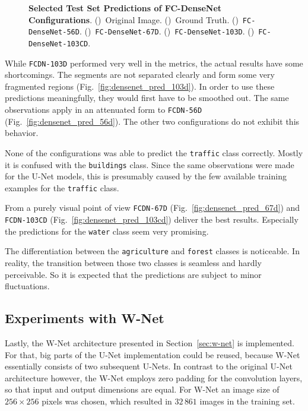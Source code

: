 \begin{figure}[h]
    \caption[Selected Test Set Predictions of FC-DenseNet Configurations]
    {\textbf{Selected Test Set Predictions of FC-DenseNet Configurations}.
    ()~Original Image.
    ()~Ground Truth.
    ()~\texttt{FC-DenseNet-56D}.
    ()~\texttt{FC-DenseNet-67D}.
    ()~\texttt{FC-DenseNet-103D}.
    ()~\texttt{FC-DenseNet-103CD}.}
    \label{fig:densenet_prediction_images}
\end{figure}

While \texttt{FCDN-103D} performed very well in the metrics, the actual results have some shortcomings. The segments are not separated clearly and form some very fragmented regions (Fig.~\ref{fig:densenet_pred_103d}). In order to use these predictions meaningfully, they would first have to be smoothed out. The same observations apply in an attenuated form to \texttt{FCDN-56D} (Fig.~\ref{fig:densenet_pred_56d}). The other two configurations do not exhibit this behavior.

None of the configurations was able to predict the \texttt{traffic} class correctly. Mostly it is confused with the \texttt{buildings} class. Since the same observations were made for the U-Net models, this is presumably caused by the few available training examples for the \texttt{traffic} class.

From a purely visual point of view \texttt{FCDN-67D} (Fig.~\ref{fig:densenet_pred_67d}) and \texttt{FCDN-103CD} (Fig.~\ref{fig:densenet_pred_103cd}) deliver the best results. Especially the predictions for the \texttt{water} class seem very promising.

The differentiation between the \texttt{agriculture} and \texttt{forest} classes is noticeable. In reality, the transition between those two classes is seamless and hardly perceivable. So it is expected that the predictions are subject to minor fluctuations.

\subsection{Experiments with W-Net}
\label{sec:wnet_experiments}
Lastly, the W-Net architecture presented in Section~\ref{sec:w-net} is implemented. For that, big parts of the U-Net implementation could be reused, because W-Net essentially consists of two subsequent U-Nets. In contrast to the original U-Net architecture however, the W-Net employs zero padding for the convolution layers, so that input and output dimensions are equal. For W-Net an image size of $256\times 256$ pixels was chosen, which resulted in $32\,861$ images in the training set.

